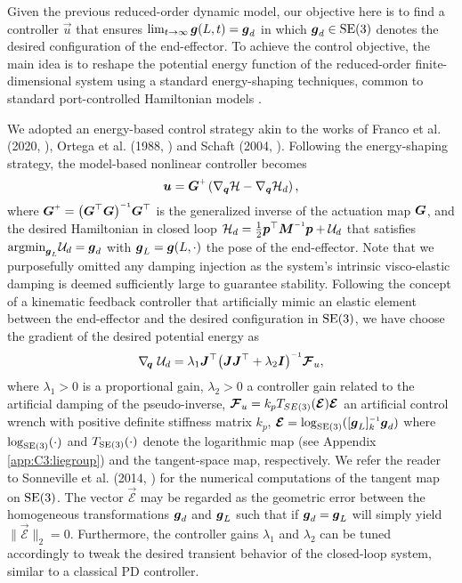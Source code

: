 Given the previous reduced-order dynamic model, our objective here is to find a controller $\vec{u}$ that ensures $\lim_{t\to\infty} \boldsymbol{g}(L,t) = \boldsymbol{g}_d$ in which $\boldsymbol{g}_d \in \textup{\textrm{SE}}(3)$ denotes the desired configuration of the end-effector. To achieve the control objective, the main idea is to reshape the potential energy function of the reduced-order finite-dimensional system using a standard energy-shaping techniques, common to standard port-controlled Hamiltonian models \cite{Schaft2004,Ortega2002}.

We adopted an energy-based control strategy akin to the works of Franco et al. (2020, \cite{Franco2020}), Ortega et al. (1988, \cite{Ortega1998,Ortega2002}) and Schaft (2004, \cite{Schaft2004}). Following the energy-shaping strategy, the model-based nonlinear controller becomes
%
\begin{equation}
\vec{u} = \vec{G}\ginv \left( \nabla_{\vec{q}}\Hm - \nabla_{\vec{q}}\Hm_d \right),
\label{eq:C3:control}
\end{equation}
%
where $\mat{G}\ginv = \bigl(\mat{G}^\top \mat{G}\bigr)\inv \mat{G}^\top$ is the generalized inverse of the actuation map $\boldsymbol{G}$, and the desired Hamiltonian in closed loop
$\Hm_d = \frac{1}{2} \vec{p}^\top \mat{M}\inv \vec{p} + \Uf_d$ that satisfies $\textrm{argmin}_{\boldsymbol{g}_L} \mathcal{U}_d = \boldsymbol{g}_d$ with $\boldsymbol{g}_L = \boldsymbol{g}(L,\cdot)$ the pose of the end-effector. Note that we purposefully omitted any damping injection as the system's intrinsic visco-elastic damping is deemed sufficiently large to guarantee stability. Following the concept of a kinematic feedback controller \cite{Bullo1995,Boyer2021} that artificially mimic an elastic element between the end-effector and the desired configuration in $\textup{\textrm{SE}}(3)$, we have choose the gradient of the desired potential energy as
%
\begin{equation}
\grad{\q}\,\Uf_{d}= \lambda_1 \mat{J}^\top\bigl(\mat{J J}^\top + \lambda_2 \mat{I} \bigr)\inv \ten{F}_u,
\label{eq:C3:jacob_damped}
\end{equation}
%
where $\lambda_1 >0$ is a proportional gain, $\lambda_2 > 0$ a controller gain related to the artificial damping of the pseudo-inverse, $\boldsymbol{\mathcal{F}}_u = k_p T_{SE(3)}(\boldsymbol{\mathcal{E}})\boldsymbol{\mathcal{E}}$ an artificial control wrench with positive definite stiffness matrix $k_p$, $\mat{\mathcal{E}} = \log_{\SE{3}} ([\mat{g}_L]_k \inv \mat{g}_d)$ where $\log_{\textup{\textrm{SE}}(3)}(\cdot)
$ and $T_{\textup{\textrm{SE}}(3)}(\cdot)$ denote the logarithmic map (see Appendix \ref{app:C3:liegroup}) and the tangent-space map, respectively. We refer the reader to Sonneville et al. (2014, \cite{Sonneville2014}) for the numerical computations of the tangent map on $\textup{\textrm{SE}}(3)$. The vector $\vec{\mathcal{E}}$ may be regarded as the geometric error between the homogeneous transformations $\boldsymbol{g}_d$ and $\boldsymbol{g}_L$ such that if $\boldsymbol{g}_d = \boldsymbol{g}_L$ will simply yield $\lVert \vec{\mathcal{E}} \rVert_2 = 0$. Furthermore, the controller gains $\lambda_1$ and $\lambda_2$ can be tuned accordingly to tweak the desired transient behavior of the closed-loop system, similar to a classical PD controller.